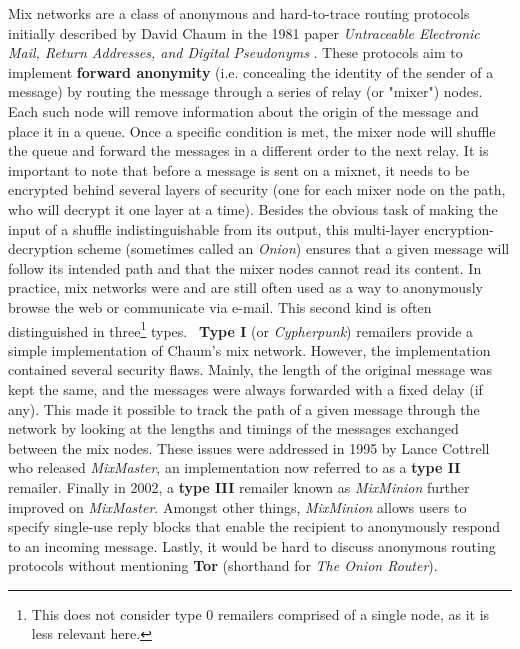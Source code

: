 \documentclass[11pt, a4paper]{article}
\begin{document}
        Mix networks are a class of anonymous and hard-to-trace routing protocols initially described by David Chaum in the 1981 paper \textit{Untraceable Electronic Mail, Return Addresses, and Digital Pseudonyms} \cite{chaum84}.
        These protocols aim to implement \textbf{forward anonymity} (i.e. concealing the identity of the sender of a message) by routing the message through a series of relay (or "mixer") nodes.
        Each such node will remove information about the origin of the message and place it in a queue.
        Once a specific condition is met, the mixer node will shuffle the queue and forward the messages in a different order to the next relay.
        It is important to note that before a message is sent on a mixnet, it needs to be encrypted behind several layers of security (one for each mixer node on the path, who will decrypt it one layer at a time).
        Besides the obvious task of making the input of a shuffle indistinguishable from its output, this multi-layer encryption-decryption scheme (sometimes called an \textit{Onion}) ensures that a given message will follow its intended path and that the mixer nodes cannot read its content.
        \bigbreak
        In practice, mix networks were and are still often used as a way to anonymously browse the web or communicate via e-mail.
        This second kind is often distinguished in three\footnote{This does not consider type 0 remailers comprised of a single node, as it is less relevant here.} types. \
        \textbf{Type I} (or \textit{Cypherpunk}) remailers provide a simple implementation of Chaum's mix network.
        However, the implementation contained several security flaws.
        Mainly, the length of the original message was kept the same, and the messages were always forwarded with a fixed delay (if any).
        This made it possible to track the path of a given message through the network by looking at the lengths and timings of the messages exchanged between the mix nodes.
        These issues were addressed in 1995 by Lance Cottrell who released \textit{MixMaster}, an implementation now referred to as a \textbf{type II} remailer.
        Finally in 2002, a \textbf{type III} remailer known as \textit{MixMinion} \cite{mixminion} further improved on \textit{MixMaster}.
        Amongst other things, \textit{MixMinion} allows users to specify single-use reply blocks that enable the recipient to anonymously respond to an incoming message.
        \bigbreak
        Lastly, it would be hard to discuss anonymous routing protocols without mentioning \textbf{Tor} (shorthand for \textit{The Onion Router}).
\end{document}
